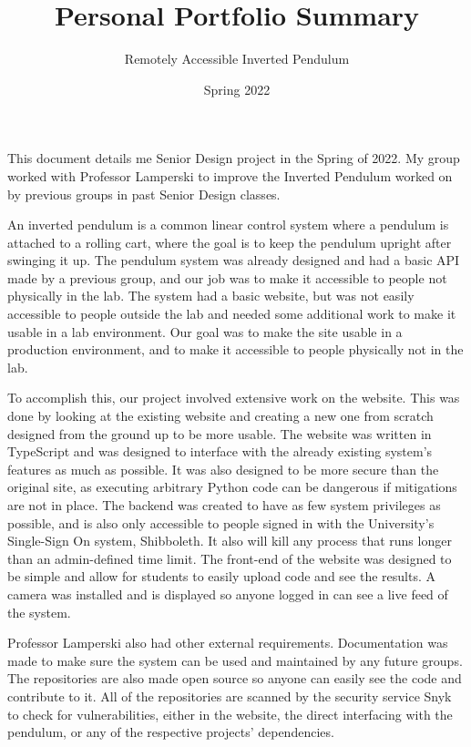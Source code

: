\documentclass[12pt]{article}
\title{Personal Portfolio Summary}
\author{Remotely Accessible Inverted Pendulum}
\date{Spring 2022}
\begin{document}
\begin{singlespace}
    \maketitle{}
\end{singlespace}
  This document details me Senior Design project in the Spring of 2022.
  My group worked with Professor Lamperski to improve the Inverted Pendulum worked on by previous groups in past Senior Design classes.

  An inverted pendulum is a common linear control system where a pendulum is attached to a rolling cart, where the goal is to keep the pendulum upright after swinging it up.
  The pendulum system was already designed and had a basic API made by a previous group, and our job was to make it accessible to people not physically in the lab.
  The system had a basic website, but was not easily accessible to people outside the lab and needed some additional work to make it usable in a lab environment.
  Our goal was to make the site usable in a production environment, and to make it accessible to people physically not in the lab.

  To accomplish this, our project involved extensive work on the website.
  This was done by looking at the existing website and creating a new one from scratch designed from the ground up to be more usable.
  The website was written in TypeScript and was designed to interface with the already existing system's features as much as possible.
  It was also designed to be more secure than the original site, as executing arbitrary Python code can be dangerous if mitigations are not in place.
  The backend was created to have as few system privileges as possible, and is also only accessible to people signed in with the University's Single-Sign On system, Shibboleth.
  It also will kill any process that runs longer than an admin-defined time limit.
  The front-end of the website was designed to be simple and allow for students to easily upload code and see the results.
  A camera was installed and is displayed so anyone logged in can see a live feed of the system.

  Professor Lamperski also had other external requirements.
  Documentation was made to make sure the system can be used and maintained by any future groups.
  The repositories are also made open source so anyone can easily see the code and contribute to it.
  All of the repositories are scanned by the security service Snyk to check for vulnerabilities, either in the website, the direct interfacing with the pendulum, or any of the respective projects' dependencies.
\end{document}
